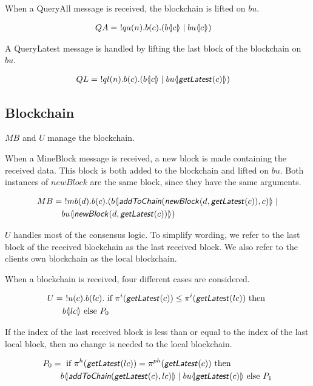 When a QueryAll message is received, the blockchain is lifted on $bu$.

\begin{align*}
    QA &=\ !qa(n). b(c).(b \langle \! | c | \! \rangle \mid bu \langle \! | c | \! \rangle)
\end{align*}

A QueryLatest message is handled by lifting the last block of the blockchain on $bu$.

\begin{align*}
	QL &=\ !ql(n). b(c).(b \langle \! | c | \! \rangle \mid bu \langle \! | \text{\sffamily \textit{getLatest}\normalfont}(c) | \! \rangle)
\end{align*}

\subsection{Blockchain}\label{subsec:blockchain}

$MB$ and $U$ manage the blockchain.

When a MineBlock message is received, a new block is made containing the received data.
This block is both added to the blockchain and lifted on $bu$.
Both instances of $newBlock$ are the same block, since they have the same arguments.

\begin{align*}
    MB &=\ !mb(d). b(c).( b \langle \! | \text{\sffamily \textit{addToChain}\normalfont}(\text{\sffamily \textit{newBlock}\normalfont}(d,\text{\sffamily \textit{getLatest}\normalfont}(c)),c) | \! \rangle \mid \\
    &\quad bu \langle \! | \text{\sffamily \textit{newBlock}\normalfont}(d, \text{\sffamily \textit{getLatest}\normalfont}(c)) | \! \rangle)
\end{align*}

$U$ handles most of the consensus logic.
To simplify wording, we refer to the last block of the received blockchain as the last received block.
We also refer to the clients own blockchain as the local blockchain.

When a blockchain is received, four different cases are considered.

\begin{align*}
	U &=\ !u(c). b(lc). \text{ if }\pi^{i}( \text{\sffamily \textit{getLatest}\normalfont}(c)) \leq \pi^{i}(\text{\sffamily \textit{getLatest}\normalfont}(lc))\text{ then }\\
	&\quad b \langle \! | lc | \! \rangle\text{ else }P_0
\end{align*}

If the index of the last received block is less than or equal to the index of the last local block, then no change is needed to the local blockchain.

\begin{align*}
	P_0 &=\text{ if }\pi^{h}(\text{\sffamily \textit{getLatest}\normalfont}(lc))=\pi^{ph}(\text{\sffamily \textit{getLatest}\normalfont}(c))\text{ then }\\
	&\quad b \langle \! | \text{\sffamily \textit{addToChain}\normalfont}(\text{\sffamily \textit{getLatest}\normalfont}(c),lc) | \! \rangle \mid bu \langle \! | \text{\sffamily \textit{getLatest}\normalfont}(c) | \! \rangle\text{ else }P_1
\end{align*}

